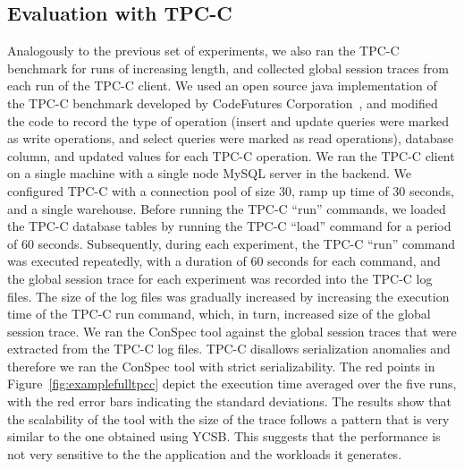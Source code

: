 \documentclass[journal,compsoc]{IEEEtran}
\begin{document}
 \subsection{Evaluation with TPC-C}\label{sec:evaltpcc}
 Analogously to the previous set of experiments, we also ran the TPC-C benchmark for runs of increasing length, and collected global session traces from each run of the TPC-C client. We used an open source java implementation of the TPC-C benchmark developed by CodeFutures Corporation~\cite{Tpcc2015}, and modified the code to record the type of operation  (insert and update queries were marked as write operations, and select queries were marked as read operations), database column, and updated values for each TPC-C operation.  We ran the TPC-C client on a single  machine with a single node MySQL server in the backend. We configured TPC-C with a connection pool of size 30, ramp up time of 30 seconds, and a single warehouse. Before running the TPC-C ``run'' commands, we loaded the TPC-C database tables by running the TPC-C ``load'' command for a period of 60 seconds. Subsequently,  during each experiment, the TPC-C ``run'' command was executed repeatedly, with a duration of 60 seconds for each command, and the global session trace for each experiment was recorded into the TPC-C log files. The size of the log files was gradually increased by increasing the execution time of the TPC-C run command, which, in turn, increased size of the global session trace.  We ran the ConSpec tool against the global session traces that were extracted from the TPC-C log files. TPC-C  disallows serialization anomalies and therefore we ran the ConSpec tool with strict serializability. The red points in Figure~\ref{fig:examplefulltpcc} depict the execution time averaged over the five runs, with the red error bars indicating the standard deviations.
The results show that the scalability of the tool with the size of the trace follows a pattern that is very similar to the one obtained using YCSB. This suggests that the performance is not very sensitive to the the application and the workloads it generates.
\end{document}
